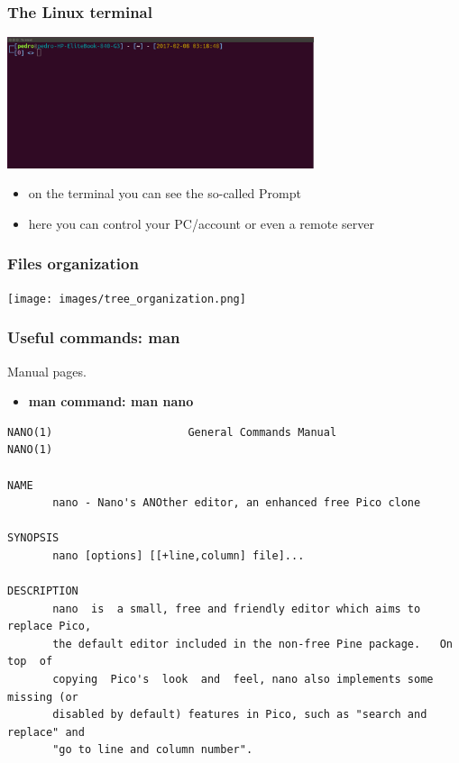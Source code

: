 \begin{frame}
	\frametitle{The Linux terminal}
        \begin{center}
        \includegraphics[width=9cm]{images/terminal_linux.png}
        \end{center}
	\begin{itemize}
		\item	on the terminal you can see the so-called Prompt
		\item	here you can control your PC/account or even
                 a remote server
	\end{itemize}
	
\end{frame}

\begin{frame}
	\frametitle{Files organization}
        \begin{center}
        \texttt{[image: images/tree\_organization.png]}
        \end{center}
\end{frame}

\begin{frame}[fragile]
	\frametitle{Useful commands: man}
        Manual pages. 
       
	\begin{itemize}
		\item \textbf{man command: man nano}
	\end{itemize}

{\tiny
	\begin{verbatim}
NANO(1)                     General Commands Manual                    NANO(1)

NAME
       nano - Nano's ANOther editor, an enhanced free Pico clone

SYNOPSIS
       nano [options] [[+line,column] file]...

DESCRIPTION
       nano  is  a small, free and friendly editor which aims to replace Pico,
       the default editor included in the non-free Pine package.   On  top  of
       copying  Pico's  look  and  feel, nano also implements some missing (or
       disabled by default) features in Pico, such as "search and replace" and
       "go to line and column number".
	\end{verbatim}
}
\end{frame}

